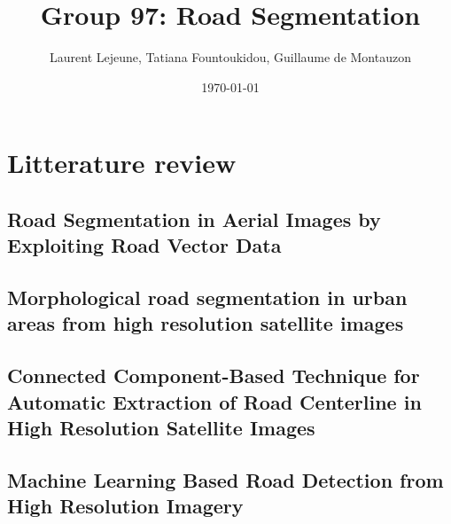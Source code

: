 \documentclass[10pt,conference,compsocconf]{IEEEtran}
\author{Laurent Lejeune, Tatiana Fountoukidou, Guillaume de Montauzon}
\date{\today}
\title{Group 97: Road Segmentation}
\begin{document}
\maketitle
\section{Litterature review}
\label{sec:orgheadline5}
\subsection{Road Segmentation in Aerial Images by Exploiting Road Vector Data \cite{6602035}}
\label{sec:orgheadline1}
\subsection{Morphological road segmentation in urban areas from high resolution satellite images \cite{gaetano:inria-00618222}}
\label{sec:orgheadline2}
\subsection{Connected Component-Based Technique for Automatic Extraction of Road Centerline in High Resolution Satellite Images \cite{sujatha15_connec_compon_based_techn_autom}}
\label{sec:orgheadline3}
\subsection{Machine Learning Based Road Detection from High Resolution Imagery \cite{2016ISPAr41B3..891L}}
\label{sec:orgheadline4}



\printbibliography
\end{document}
